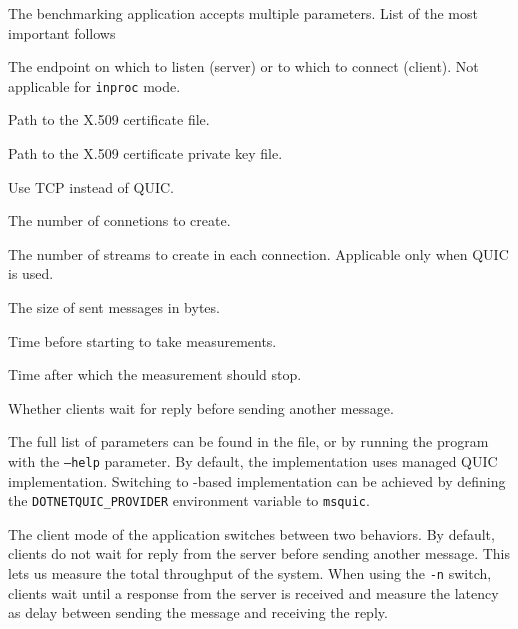 The benchmarking application accepts multiple parameters. List of the most important follows

\begin{description}

     The endpoint on which to listen (server) or to which to connect (client). Not applicable for \texttt{inproc} mode.

     Path to the X.509 certificate file.

     Path to the X.509 certificate private key file.

     Use TCP instead of QUIC\@.

     The number of connetions to create.

     The number of streams to create in each connection. Applicable only when QUIC is used.

     The size of sent messages in bytes.

     Time before starting to take measurements.

     Time after which the measurement should stop.


     Whether clients wait for reply before sending another message.

\end{description}

The full list of parameters can be found in the  file, or by running the
program with the \texttt{--help} parameter. By default, the implementation uses managed QUIC
implementation. Switching to \libmsquic{}-based implementation can be achieved by defining the
\texttt{DOTNETQUIC_PROVIDER} environment variable to \texttt{msquic}.

The client mode of the application switches between two behaviors. By default, clients do not wait
for reply from the server before sending another message. This lets us measure the total throughput
of the system. When using the \texttt{-n} switch, clients wait until a response from the server is
received and measure the latency as delay between sending the message and receiving the reply.

